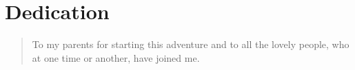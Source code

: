 \chapter*{Dedication}
\label{ch:list_of_appendices}
\begin{quote}
  To my parents for starting this adventure and to all the lovely people, who at one time or another, have joined me.
\end{quote}
\vfill
